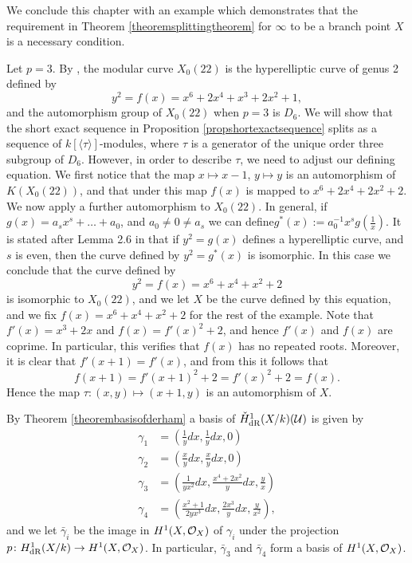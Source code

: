 We conclude this chapter with an example which demonstrates that the requirement in Theorem \ref{theoremsplittingtheorem} for $\infty$ to be a branch point $X$ is a necessary condition.

    \begin{ex}
    Let $p = 3$.
    By \cite[Table 1]{automorphismshyperellipticmodular}, the modular curve $X_0(22)$ is the hyperelliptic curve of genus 2 defined by
        \[
        y^2 = f(x) = x^6 + 2x^4 +x^3 +2x^2 +1,
        \]
    and the automorphism group of $X_0(22)$ when $p=3$ is $D_6$.
    We will show that the short exact sequence in Proposition \ref{propshortexactsequence} splits as a sequence of $k[\langle \tau \rangle]$-modules, where $\tau$ is a generator of the unique order three subgroup of $D_6$.
    However, in order to describe $\tau$, we need to adjust our defining equation.
    We first notice that the map $x \mapsto x-1$, $y \mapsto y$ is an automorphism of $K(X_0(22))$, and that under this map $f(x)$ is mapped to $x^6 + 2x^4 + 2x^2 + 2$.
     We now apply a further automorphism to $X_0(22)$.
     In general, if $g(x) = a_sx^s + \ldots + a_0$, and $a_0 \neq 0 \neq a_s$ we can define$g^*(x) := a_0^{-1}x^sg\left( \frac{1}{x}\right)$.
     It is stated after Lemma 2.6 in \cite{automorphismshyperellipticmodular} that if $y^2 = g(x)$ defines a hyperelliptic curve, and $s$ is even, then the curve defined by $y^2 = g^*(x)$ is isomorphic.
     In this case we conclude that the curve defined by
        \[
        y^2 = f(x) =  x^6 + x^4 + x^2 + 2
        \]
    is isomorphic to $X_0(22)$, and we let $X$ be the curve defined by this equation, and we fix $f(x) = x^6 + x^4 + x^2 + 2$ for the rest of the example.
    Note that $f'(x) = x^3 + 2x$ and $f(x) = f'(x)^2 +2$, and hence $f'(x)$ and $f(x)$ are coprime.
    In particular, this verifies that $f(x)$ has no repeated roots.
    Moreover, it is clear that $f'(x+1) = f'(x)$, and from this it follows that
        \[
        f(x+1) = f'(x+1)^2 + 2 = f'(x)^2 + 2 = f(x).
        \]
    Hence the map $\tau \colon (x,y) \mapsto (x+1,y) $ is an automorphism of $X$.
    
    By Theorem \ref{theorembasisofderham} a basis of $\check{H}_{\text {dR}}^1(X/k)({\mathcal U})$ is given by
        \begin{align*}
        \gamma_1 & = \left( \frac{1}{y}dx, \frac{1}{y}dx, 0 \right) \\
        \gamma_2 & = \left(\frac{x}{y}dx, \frac{x}{y}dx, 0\right) \\
        \gamma_3 & =\left( \frac{1}{yx^2}dx, \frac{x^4+2x^2}{y}dx, \frac{y}{x} \right) \\
        \gamma_4 & =\left( \frac{x^2 +1}{2yx^3}dx, \frac{2x^3}{y}dx, \frac{y}{x^2}\right),
        \end{align*}
    and we let $\bar\gamma_i$ be the image in $H^1(X,\mathcal{O}_X)$ of $\gamma_i$ under the projection $p \colon H_{\text {dR}}^1(X/k) \rightarrow H^1(X,\mathcal{O}_X)$.
    In particular, $\bar \gamma_3$ and $\bar \gamma_4$ form a basis of $H^1(X,\mathcal{O}_X)$.


\end{ex}
